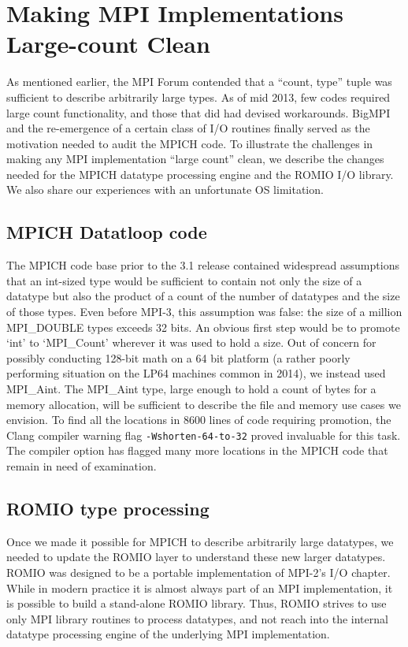 
\section{Making MPI Implementations Large-count Clean}
As mentioned earlier, the MPI Forum contended that a ``count, type''
tuple was sufficient to describe arbitrarily large types.  As of mid 2013, few codes
required large count functionality, and those that did had devised workarounds.
BigMPI and the re-emergence of a certain class of I/O routines finally served
as the motivation needed to audit the MPICH code.  To illustrate the challenges in
making any MPI implementation ``large count'' clean, we describe the changes
needed for the MPICH datatype processing engine and the ROMIO I/O library. We
also share our experiences with an unfortunate OS limitation.


\subsection{MPICH Datatloop code}
The MPICH code base prior to the
3.1 release contained widespread assumptions that an int-sized type
would be sufficient to contain not only the size of a datatype but also the product
of a count of the number of datatypes and the size of those types.
Even before MPI-3, this assumption was false: the size of a million MPI\_DOUBLE
types exceeds 32 bits.
An obvious first step would be to promote `int' to `MPI\_Count' wherever it was
used to hold a size.
Out of concern for possibly conducting 128-bit math on a 64 bit platform (a
rather poorly performing situation on the LP64 machines common in 2014),
we instead used MPI\_Aint.  The MPI\_Aint type, large enough to hold a
count of bytes for a memory allocation, will be sufficient to describe the file
and memory use cases we envision.  To find all the locations in 8600 lines of
code requiring promotion, the Clang compiler warning flag
\texttt{-Wshorten-64-to-32} proved invaluable for this task.  The compiler option has
flagged many more
locations in the MPICH code that remain in need of examination.

\subsection{ROMIO type processing}
\label{sec:romio_typeproc}

Once we made it possible for MPICH to describe arbitrarily large datatypes, we
needed to update the ROMIO layer to understand these new larger datatypes.
ROMIO \cite{thakur:mpi-io-implement} was designed to be a portable
 implementation of MPI-2's I/O
chapter.  While in modern practice it is almost always part of an MPI
implementation, it is possible to build a stand-alone ROMIO library.  Thus,
ROMIO strives to use only MPI library routines to process datatypes, and not reach into the internal datatype processing engine of the underlying MPI implementation.

